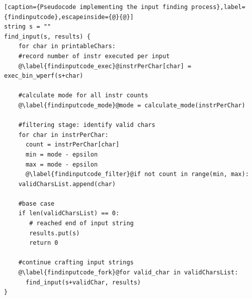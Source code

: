 \documentclass{acm_proc_article-sp}
\begin{document}
\begin{lstlisting}[caption={Pseudocode implementing the input finding process},label={findinputcode},escapeinside={@}{@}]
string s = ""
find_input(s, results) {
    for char in printableChars:
    #record number of instr executed per input
    @\label{findinputcode_exec}@instrPerChar[char] = exec_bin_wperf(s+char)

    #calculate mode for all instr counts	
    @\label{findinputcode_mode}@mode = calculate_mode(instrPerChar)

    #filtering stage: identify valid chars
    for char in instrPerChar:
      count = instrPerChar[char]
      min = mode - epsilon
      max = mode - epsilon
      @\label{findinputcode_filter}@if not count in range(min, max):
	validCharsList.append(char)
	
    #base case
    if len(validCharsList) == 0:
       # reached end of input string
       results.put(s)
       return 0

    #continue crafting input strings	
    @\label{findinputcode_fork}@for valid_char in validCharsList:
      find_input(s+validChar, results)
}

\end{lstlisting}
\end{document}
